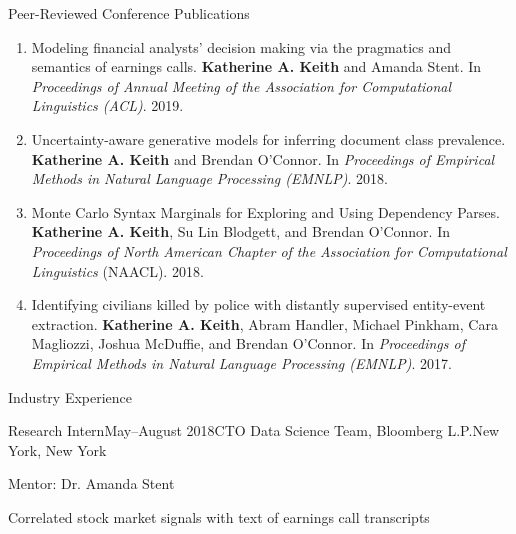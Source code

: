 \documentclass{resume} %
\begin{document}
%
\begin{rSection}{Peer-Reviewed Conference Publications}
\begin{enumerate}

\item Modeling financial analysts' decision making via the pragmatics and semantics of earnings calls. 
\textbf{Katherine A. Keith} and Amanda Stent. 
In \emph{Proceedings of Annual Meeting of the Association for Computational Linguistics (ACL)}.  2019. 

\item Uncertainty-aware generative models for inferring document class prevalence.
\textbf{Katherine A. Keith} and Brendan O'Connor. 
In \emph{Proceedings of Empirical Methods in Natural Language Processing (EMNLP)}. 2018. 

\item Monte Carlo Syntax Marginals for Exploring and Using Dependency Parses.
\textbf{Katherine A. Keith}, Su Lin Blodgett, and Brendan O'Connor.
In \emph{Proceedings of North American Chapter of the Association for Computational Linguistics} (NAACL). 2018.

\item Identifying civilians killed by police with distantly supervised entity-event extraction. 
\textbf{Katherine A. Keith}, Abram Handler, Michael Pinkham, Cara Magliozzi, Joshua McDuffie, and Brendan O'Connor. In \emph{Proceedings of Empirical Methods in Natural Language Processing (EMNLP)}. 2017. 
\end{enumerate}

\end{rSection}


\begin{rSection}{Industry Experience}

\begin{rSubsection}{Research Intern}{May--August 2018}{CTO Data Science Team, Bloomberg L.P.}{New York, New York}
\item Mentor: Dr. Amanda Stent
\item Correlated stock market signals with text of earnings call transcripts 
\end{rSubsection}

\end{rSection}
\end{document}
